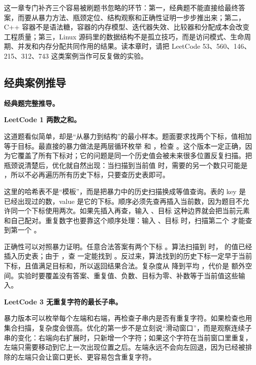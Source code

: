 
这一章专门补齐三个容易被刷题书忽略的环节：第一，经典题不能直接给最终答案，而要从暴力方法、瓶颈定位、结构观察和正确性证明一步步推出来；第二，C++ 容器不是语法糖，容器的内存模型、迭代器失效、比较器和分配成本会改变工程质量；第三，Linux 源码里的数据结构不是孤立技巧，而是访问模式、生命周期、并发和内存分配共同作用的结果。读本章时，请把 LeetCode 53、560、146、215、312、743 这类案例当作可反复做的实验。

\subsection{经典案例推导}

\noindent\textbf{经典题完整推导。}

\noindent\textbf{LeetCode 1 两数之和。}

这道题看似简单，却是“从暴力到结构”的最小样本。题面要求找两个下标，值相加等于目标。最直接的暴力做法是两层循环枚举  和 ，检查 。这个版本一定正确，因为它覆盖了所有下标对；它的问题是同一个历史值会被未来很多位置反复扫描。把瓶颈说清楚后，优化就自然出现：当扫描到当前值  时，需要的另一个数只可能是 ，所以不必再遍历所有历史下标，只要查历史表即可。

这里的哈希表不是“模板”，而是把暴力中的历史扫描换成等值查询。表的 key 是已经出现过的数，value 是它的下标。顺序必须先查再插入当前数，因为题目不允许同一个下标使用两次。如果先插入再查，输入 \code{[3]}、目标  这种边界就会把当前元素和自己配对。重复数字也要靠这个顺序处理：输入 \code{[3,3]}、目标  时，扫描第二个  才能查到第一个 。

正确性可以对照暴力证明。任意合法答案有两个下标 。算法扫描到  时， 的值已经插入历史表；由于 ，查  一定能找到 。反过来，算法找到的历史下标一定早于当前下标，且值满足目标和，所以返回结果合法。复杂度从  降到平均 ，代价是  额外空间。实验时要覆盖没有答案、重复值、负数、目标为零、补数等于当前值这些输入。

\noindent\textbf{LeetCode 3 无重复字符的最长子串。}

暴力版本可以枚举每个左端和右端，再检查子串内是否有重复字符。如果检查也用集合扫描，复杂度会很高。优化的第一步不是立刻说“滑动窗口”，而是观察连续子串的变化：右端向右扩展时，只新增一个字符；如果这个字符在当前窗口里重复，左端只需要移动到它上一次出现位置之后。左端永远不会向左回退，因为已经被排除的左端只会让窗口更长、更容易包含重复字符。

